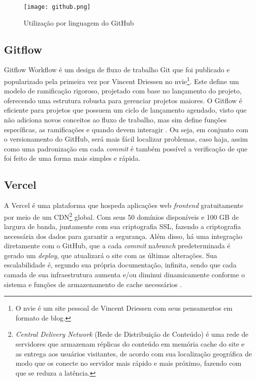 \begin{figure}[H]
    \caption{\label{utilizacao_github}Utilização por linguagem do GitHub}
    \vspace{5pt}
    \centering
    \texttt{[image: github.png]}
    \vspace{5pt}
\end{figure}

\subsection{Gitflow}
Gitflow Workflow é um design de fluxo de trabalho Git que foi publicado e popularizado pela primeira vez por Vincent Driessen no nvie\footnote{O nvie é um site pessoal de Vincent Driessen com seus pensamentos em formato de blog.}. Este define um modelo de ramificação rigoroso, projetado com base no lançamento do projeto, oferecendo uma estrutura robusta para gerenciar projetos maiores. O Gitflow é eficiente para projetos que possuem um ciclo de lançamento agendado, visto que não adiciona novos conceitos ao fluxo de trabalho, mas sim define funções específicas, as ramificações e quando devem interagir \cite{SANTACROCE}. Ou seja, em conjunto com o versionamento do GitHub, será mais fácil localizar problemas, caso haja, assim como uma padronização em cada \textit{commit} é também possível a verificação de que foi feito de uma forma mais simples e rápida.

\subsection{Vercel}
A Vercel é uma plataforma que hospeda aplicações web \textit{frontend} gratuitamente por meio de um CDN\footnote{\textit{Central Delivery Network} (Rede de Distribuição de Conteúdo) é uma rede de servidores que armazenam réplicas do conteúdo em memória cache do site e as entrega aos usuários visitantes, de acordo com sua localização geográfica de modo que os conecte no servidor mais rápido e mais próximo, fazendo com que se reduza a latência.}
global. Com seus 50 domínios disponíveis e 100 GB de largura de banda, juntamente com sua criptografia SSL, fazendo a criptografia necessária dos dados para garantir a segurança. Além disso, há uma integração diretamente com o GitHub, que a cada \textit{commit} na\textit{branch} predeterminada é gerado um \textit{deploy}, que atualizará o site com as últimas alterações. Sua escalabilidade é, segundo sua própria documentação, infinita, sendo que cada camada de sua infraestrutura aumenta e/ou diminui dinamicamente conforme o sistema e funções de armazenamento de cache necessários \cite{VERCEL}. 

